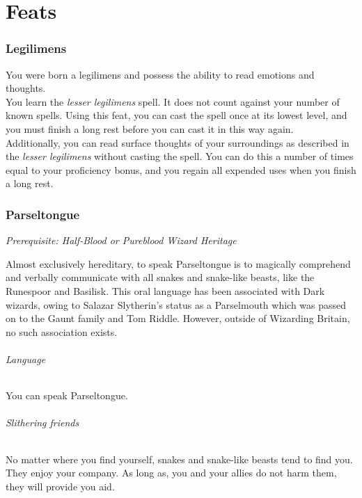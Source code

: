 \documentclass[a4paper,twocolumn,openany,nodeprecatedcode]{dndbook}
\begin{document}
\chapter{Feats}

    \subsection{Legilimens}

        You were born a legilimens and possess the ability to read emotions and thoughts.\\

        You learn the \textit{lesser legilimens} spell.
        It does not count against your number of known spells.
        Using this feat, you can cast the spell once at its lowest level, and you must finish a long rest before you can cast it in this way again.\\

        Additionally, you can read surface thoughts of your surroundings as described in the \textit{lesser legilimens} without casting the spell.
        You can do this a number of times equal to your proficiency bonus, and you regain all expended uses when you finish a long rest.


    \subsection{Parseltongue}

        \textit{Prerequisite: Half-Blood or Pureblood Wizard Heritage}

        Almost exclusively hereditary, to speak Parseltongue is to magically comprehend and verbally communicate with all snakes and snake-like beasts, like the Runespoor and Basilisk. This oral language has been associated with Dark wizards, owing to Salazar Slytherin's status as a Parselmouth which was passed on to the Gaunt family and Tom Riddle. However, outside of Wizarding Britain, no such association exists.

        \subparagraph{Language} You can speak Parseltongue.

        \subparagraph{Slithering friends}
        No matter where you find yourself,
        snakes and snake-like beasts tend to find you.
        They enjoy your company.
        As long as, you and your allies do not harm them, they will provide you aid.
\end{document}
